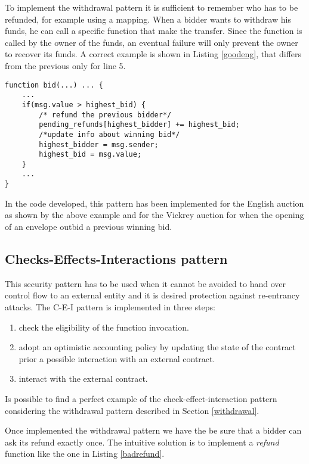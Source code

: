 \documentclass{article}
\begin{document}
To implement the withdrawal pattern it is sufficient to remember who has to be refunded, for example using a mapping. When a bidder wants to withdraw his funds, he can call a specific function that make the transfer. Since the function is called by the owner of the funds, an eventual failure will only prevent the owner to recover its funds. A correct example is shown in Listing \ref{goodeng}, that differs from the previous only for line 5.

\begin{lstlisting}[language=Solidity, caption={Correct code that do use the withdrawal pattern},captionpos=b, label=goodeng]
 function bid(...) ... {
    ...
    if(msg.value > highest_bid) {
        /* refund the previous bidder*/
        pending_refunds[highest_bidder] += highest_bid;
        /*update info about winning bid*/
        highest_bidder = msg.sender;
        highest_bid = msg.value;
    }
    ...   
}
\end{lstlisting}

In the code developed, this pattern has been implemented for the English auction as shown by the above example and for the Vickrey auction for when the opening of an envelope outbid a previous winning bid.  

\subsection{Checks-Effects-Interactions pattern}\label{CEIpattern}
This security pattern has to be used when it cannot be avoided to hand over control flow to an external entity and it is desired protection against re-entrancy attacks. The C-E-I pattern is implemented in three steps:
\begin{enumerate}
    \item check the eligibility of the function invocation.
    \item adopt an optimistic accounting policy by updating the state of the contract prior a possible interaction with an external contract.
    \item interact with the external contract.
\end{enumerate}
Is possible to find a perfect example of the check-effect-interaction pattern considering the withdrawal pattern described in Section \ref{withdrawal}.

Once implemented the withdrawal pattern we have the be sure that a bidder can ask its refund exactly once. The intuitive solution is to implement a \textit{refund} function like the one in Listing \ref{badrefund}.
\end{document}
